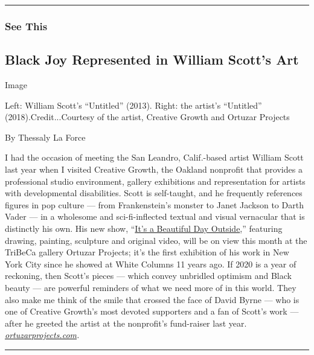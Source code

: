 \begin{center}\rule{0.5\linewidth}{\linethickness}\end{center}

\hypertarget{see-this}{%
\subsubsection{See This}\label{see-this}}

\hypertarget{black-joy-represented-in-william-scotts-art}{%
\subsection{Black Joy Represented in William Scott's
Art}\label{black-joy-represented-in-william-scotts-art}}

Image

Left: William Scott's ``Untitled'' (2013). Right: the artist's
``Untitled'' (2018).Credit...Courtesy of the artist, Creative Growth and
Ortuzar Projects

By Thessaly La Force

I had the occasion of meeting the San Leandro, Calif.-based artist
William Scott last year when I visited Creative Growth, the Oakland
nonprofit that provides a professional studio environment, gallery
exhibitions and representation for artists with developmental
disabilities. Scott is self-taught, and he frequently references figures
in pop culture --- from Frankenstein's monster to Janet Jackson to Darth
Vader --- in a wholesome and sci-fi-inflected textual and visual
vernacular that is distinctly his own. His new show,
``\href{http://www.ortuzarprojects.com/exhibitions/william-scott/works?view=slider}{It's
a Beautiful Day Outside},'' featuring drawing, painting, sculpture and
original video, will be on view this month at the TriBeCa gallery
Ortuzar Projects; it's the first exhibition of his work in New York City
since he showed at White Columns 11 years ago. If 2020 is a year of
reckoning, then Scott's pieces --- which convey unbridled optimism and
Black beauty --- are powerful reminders of what we need more of in this
world. They also make me think of the smile that crossed the face of
David Byrne --- who is one of Creative Growth's most devoted supporters
and a fan of Scott's work --- after he greeted the artist at the
nonprofit's fund-raiser last year.
\href{http://www.ortuzarprojects.com/}{\emph{ortuzarprojects.com}}\emph{.}

\begin{center}\rule{0.5\linewidth}{\linethickness}\end{center}


